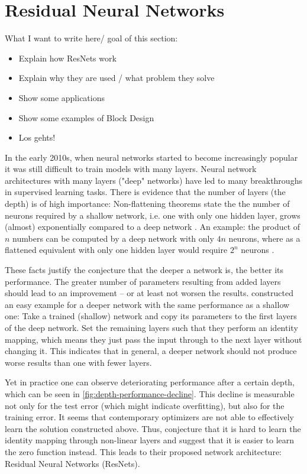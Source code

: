 \section{Residual Neural Networks}
\label{sec:neural-networks}

What I want to write here/ goal of this section:
\begin{itemize}
	\item Explain how ResNets work
	\item Explain why they are used / what problem they solve
	\item Show some applications
	\item Show some examples of Block Design
	\item Los gehts!
\end{itemize}

In the early 2010s, when neural networks started to become increasingly popular it was still difficult to train models with many layers.
Neural network architectures with many layers ("deep" networks) have led to many breakthroughs in supervised learning tasks.
There is evidence that the number of layers (the depth) is of high importance:
Non-flattening theorems state the the number of neurons required by a shallow network, i.e. one with only one hidden layer, grows (almost) exponentially compared to a deep network \cite{lin17,delalleau11}.
An example: the product of $n$ numbers can be computed by a deep network with only $4n$ neurons, where as a flattened equivalent with only one hidden layer would require $2^n$ neurons \cite{lin17}.

These facts justify the conjecture that the deeper a network is, the better its performance.
The greater number of parameters resulting from added layers should lead to an improvement --  or at least not worsen the results.
\citet{he16} constructed an easy example for a deeper network with the same performance as a shallow one:
Take a trained (shallow) network and copy its parameters to the first layers of the deep network.
Set the remaining layers such that they perform an identity mapping, which means they just pass the input through to the next layer without changing it.
This indicates that in general, a deeper network should not produce worse results than one with fewer layers.



Yet in practice one can observe deteriorating performance after a certain depth, which can be seen in \cref{fig:depth-performance-decline}.
This decline is measurable not only for the test error (which might indicate overfitting), but also for the training error.
It seems that contemporary optimizers are not able to effectively learn the solution constructed above.
Thus, \citet{he16} conjecture that it is hard to learn the identity mapping through non-linear layers and suggest that it is easier to learn the zero function instead.
This leads to their proposed network architecture: Residual Neural Networks (ResNets).

